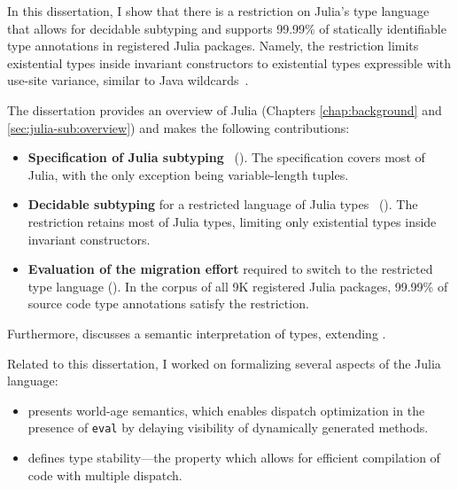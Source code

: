 In this dissertation, I show that there is
a restriction on Julia's type language that allows for decidable subtyping
and supports 99.99\% of statically identifiable type annotations
in registered Julia packages.
Namely, the restriction limits existential types inside invariant constructors
to existential types expressible with use-site variance,
similar to Java wildcards~\cite{bib:torgersen:wildcards:2004}.

The dissertation provides an overview of Julia
(Chapters \ref{chap:background} and \ref{sec:julia-sub:overview})
and makes the following contributions:
\begin{itemize}
  \item \textbf{Specification of Julia
    subtyping}~\citep*{bib:zappa-nardelli:julia-sub:oopsla:2018}
    ().
    The specification covers most of Julia, with the only exception being
    variable-length tuples.
  \item \textbf{Decidable subtyping} for a restricted language of Julia 
    types~\citep*{bib:belyakova:julia-sub-dec:draft} ().
    The restriction retains most of Julia types, limiting only existential types
    inside invariant constructors.
  \item \textbf{Evaluation of the migration effort} required to switch to 
    the restricted type language (). 
    In the corpus of all 9K registered Julia packages, 99.99\% of source code 
    type annotations satisfy the restriction.
\end{itemize}
Furthermore,  discusses a semantic interpretation
of types, extending \cite{bib:belyakova:minijl-sub:ftfjp:2019}.

Related to this dissertation, I worked on formalizing several aspects of the
Julia language:
\begin{itemize}
  \item \citep*{bib:belyakova:world-age:oopsla:2020} presents 
    world-age semantics, which enables dispatch optimization in the presence
    of \texttt{eval} by delaying visibility of dynamically generated methods.
  \item \citep*{bib:pelenitsyn:type-stability:oopsla:2021} defines type
    stability---the property which allows for efficient compilation of code with
    multiple dispatch.
\end{itemize}
